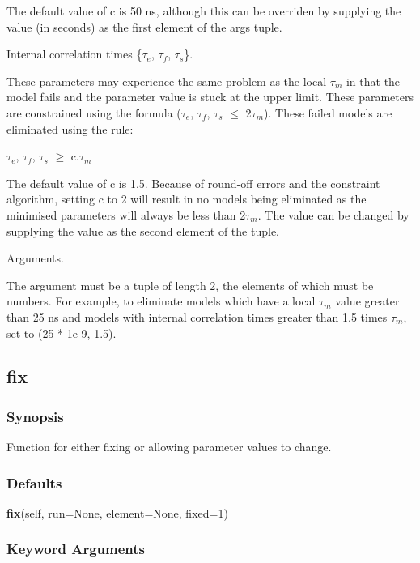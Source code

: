 The default value of c is 50 ns, although this can be overriden by supplying the value (in
seconds) as the first element of the args tuple.


Internal correlation times \{$\tau_e$, $\tau_f$, $\tau_s$\}.

These parameters may experience the same problem as the local $\tau_m$ in that the model fails and
the parameter value is stuck at the upper limit.  These parameters are constrained using the
formula ($\tau_e$, $\tau_f$, $\tau_s$ $\le$ 2$\tau_m$).  These failed models are eliminated using the rule:

    $\tau_e$, $\tau_f$, $\tau_s$ $\ge$ c.$\tau_m$

The default value of c is 1.5.  Because of round-off errors and the constraint algorithm,
setting c to 2 will result in no models being eliminated as the minimised parameters will
always be less than 2$\tau_m$.  The value can be changed by supplying the value as the second
element of the tuple.


Arguments.

The 
 argument must be a tuple of length 2, the elements of which must be numbers.  For
example, to eliminate models which have a local $\tau_m$ value greater than 25 ns and models with
internal correlation times greater than 1.5 times $\tau_m$, set 
 to (25 * 1e-9, 1.5).


\newpage

\subsection{fix}


\subsubsection{Synopsis}

Function for either fixing or allowing parameter values to change.

\subsubsection{Defaults}

\textsf{\textbf{fix}(self, run=None, element=None, fixed=1)}


\subsubsection{Keyword Arguments}



